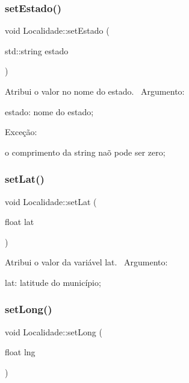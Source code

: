 \subsubsection{\texorpdfstring{set\+Estado()}{setEstado()}}
{\footnotesize\ttfamily void Localidade\+::set\+Estado (\begin{DoxyParamCaption}\item[{std\+::string}]{estado }\end{DoxyParamCaption})}

Atribui o valor no nome do estado.~\newline
 Argumento\+:
\begin{DoxyItemize}
\item estado\+: nome do estado;
\end{DoxyItemize}

Exceção\+:
\begin{DoxyItemize}
\item o comprimento da string naõ pode ser zero;
\end{DoxyItemize}\mbox{\label{classLocalidade_af9abc70199d4f50cd90add07c6d6e617}} 
\subsubsection{\texorpdfstring{set\+Lat()}{setLat()}}
{\footnotesize\ttfamily void Localidade\+::set\+Lat (\begin{DoxyParamCaption}\item[{float}]{lat }\end{DoxyParamCaption})}

Atribui o valor da variável lat.~\newline
Argumento\+:
\begin{DoxyItemize}
\item lat\+: latitude do município;
\end{DoxyItemize}\mbox{\label{classLocalidade_a9b5f805c802337480712bf010669ced8}} 
\subsubsection{\texorpdfstring{set\+Long()}{setLong()}}
{\footnotesize\ttfamily void Localidade\+::set\+Long (\begin{DoxyParamCaption}\item[{float}]{lng }\end{DoxyParamCaption})}

